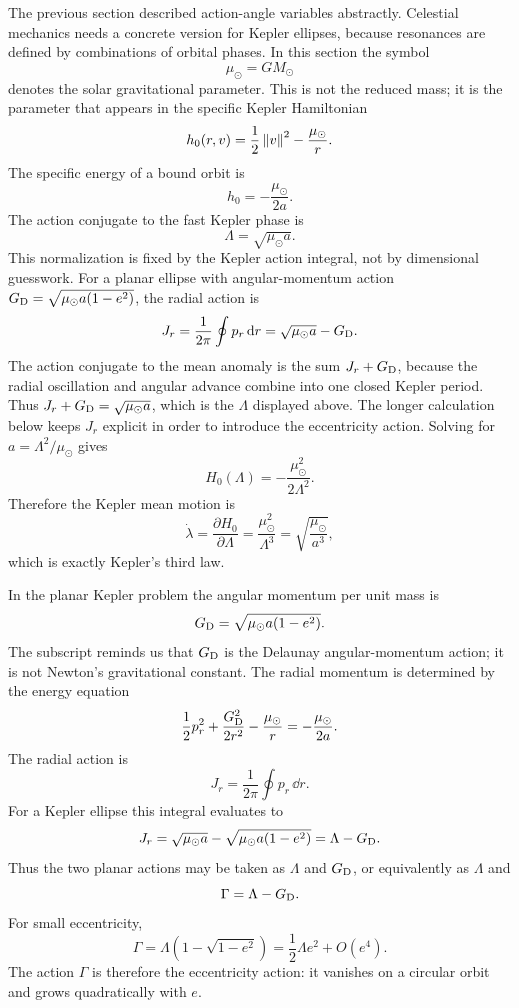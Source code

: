 The previous section described action-angle variables abstractly.  Celestial
mechanics needs a concrete version for Kepler ellipses, because resonances are
defined by combinations of orbital phases.  In this section the symbol
\[
  \mu_\odot=GM_\odot
\]
denotes the solar gravitational parameter.  This is not the reduced mass; it is
the parameter that appears in the specific Kepler Hamiltonian
\[
  h_0(r,v)=\frac12\left\lVert v\right\rVert^2-\frac{\mu_\odot}{r}.
\]
The specific energy of a bound orbit is
\[
  h_0=-\frac{\mu_\odot}{2a}.
\]
The action conjugate to the fast Kepler phase is
\[
  \boxed{\Lambda=\sqrt{\mu_\odot a}.}
\]
This normalization is fixed by the Kepler action integral, not by dimensional
guesswork.  For a planar ellipse with angular-momentum action
\(G_{\rm D}=\sqrt{\mu_\odot a(1-e^2)}\), the radial action is
\[
  J_r
  =
  \frac{1}{2\pi}\oint p_r\,\mathrm{d} r
  =
  \sqrt{\mu_\odot a}-G_{\rm D}.
\]
The action conjugate to the mean anomaly is the sum
\(J_r+G_{\rm D}\), because the radial oscillation and angular advance combine
into one closed Kepler period.  Thus \(J_r+G_{\rm D}=\sqrt{\mu_\odot a}\),
which is the \(\Lambda\) displayed above.  The longer calculation below keeps
\(J_r\) explicit in order to introduce the eccentricity action.
Solving for \(a=\Lambda^2/\mu_\odot\) gives
\[
  \boxed{
  H_0(\Lambda)=-\frac{\mu_\odot^2}{2\Lambda^2}.
  }
\]
Therefore the Kepler mean motion is
\[
  \dot\lambda=\frac{\partial H_0}{\partial \Lambda}
  =
  \frac{\mu_\odot^2}{\Lambda^3}
  =
  \sqrt{\frac{\mu_\odot}{a^3}},
\]
which is exactly Kepler's third law.

\begin{derivation}
In the planar Kepler problem the angular momentum per unit mass is
\[
  G_{\rm D}=\sqrt{\mu_\odot a(1-e^2)}.
\]
The subscript reminds us that \(G_{\rm D}\) is the Delaunay angular-momentum
action; it is not Newton's gravitational constant.  The radial momentum is
determined by the energy equation
\[
  \frac12 p_r^2+\frac{G_{\rm D}^2}{2r^2}-\frac{\mu_\odot}{r}
  =
  -\frac{\mu_\odot}{2a}.
\]
The radial action is
\[
  J_r=\frac{1}{2\pi}\oint p_r\,\dd r .
\]
For a Kepler ellipse this integral evaluates to
\[
  J_r
  =
  \sqrt{\mu_\odot a}-\sqrt{\mu_\odot a(1-e^2)}
  =
  \Lambda-G_{\rm D}.
\]
Thus the two planar actions may be taken as \(\Lambda\) and \(G_{\rm D}\), or
equivalently as \(\Lambda\) and
\[
  \Gamma=\Lambda-G_{\rm D}.
\]
For small eccentricity,
\[
  \Gamma
  =
  \Lambda\left(1-\sqrt{1-e^2}\right)
  =
  \frac12\Lambda e^2+O(e^4).
\]
The action \(\Gamma\) is therefore the eccentricity action: it vanishes on a
circular orbit and grows quadratically with \(e\).
\end{derivation}

